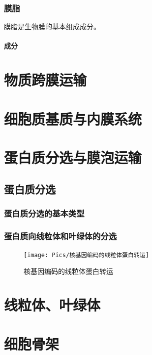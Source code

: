 \subsubsection{膜脂}

膜脂是生物膜的基本组成成分。

\paragraph{成分}





\section{物质跨膜运输}

\section{细胞质基质与内膜系统}

\section{蛋白质分选与膜泡运输}

\subsection{蛋白质分选}

\subsubsection{蛋白质分选的基本类型}

\subsubsection{蛋白质向线粒体和叶绿体的分选}

\begin{figure}[htbp]
	\centering
	\texttt{[image: Pics/核基因编码的线粒体蛋白转运]}
	\caption{核基因编码的线粒体蛋白转运}
	\label{fig:tim_tom}
\end{figure}




\section{线粒体、叶绿体}



\section{细胞骨架}

